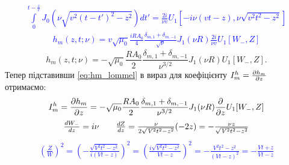 %
\textcolor{blue} { \begin{equation*} \begin{aligned}
\int \limits_{0}^{t - \frac{z}{\mathit{v}}} 
J_0 \left( \nu \sqrt{\mathit{v}^2 (t-t')^2 - z^2} 
\right) dt' = \frac{2i}{\nu \mathit{v}} U_1 
\left[ -i \nu (\mathit{v}t-z), \nu \sqrt{\mathit{v}^2t^2-z^2} \right]
\end{aligned} \end{equation*} }
%
\textcolor{blue} { \begin{equation*} \begin{aligned}
h_m (z, t; \nu) = \mathit{v} \sqrt{\mu_0} \frac{iR A_0}{4} 
\frac{\delta_{m,1} + \delta_{m,-1}} {\sqrt{\nu}} J_1 (\nu R) 
\frac{2i}{\nu \mathit{v}} U_1 \left[ W_-, Z \right]
\end{aligned} \end{equation*} }
%
\begin{equation} \label{eq:hm_lommel}
h_m (z, t; \nu) = - \sqrt{\mu_0} \frac{R A_0}{2} 
\frac{\delta_{m,1} + \delta_{m,-1}}
{\nu^{3/2}} J_1 (\nu R) U_1 \left[ W_-, Z \right].
\end{equation}
%
Тепер підставивши \eqref{eq:hm_lommel} в вираз для коефіцієнту
$ I_{m}^{h} = \frac{\partial h_m}{\partial z} $ отримаємо:
%
\textcolor{blue} { \begin{equation*} \begin{aligned}
I_{m}^{h} = \frac{\partial h_m}{\partial z} = 
- \sqrt{\mu_0} \frac{R A_0}{2} 
\frac{\delta_{m,1} + \delta_{m,-1}}
{\nu^{3/2}} J_1 (\nu R) \frac{\partial }{\partial z} U_1 [ W_-, Z ]
\end{aligned} \end{equation*} }
%
\textcolor{blue} { \begin{equation*} \begin{aligned}
\begin{array}{lcr}
\frac{d W_-}{d z} = i \nu & &
\frac{d Z}{d z} = \frac{\nu}{2 \sqrt{\mathit{V}^2 t^2 - z^2}} (-2z) = 
- \frac{\nu z}{\sqrt{\mathit{V}^2 t^2 - z^2}} \\
\end{array}
\end{aligned} \end{equation*} }
%
\textcolor{blue} { \begin{equation*} \begin{aligned}
\left( \frac{Z}{W} \right)^2 = 
\left( - \frac{ \sqrt{\mathit{V}^2 t^2-z^2}}{i(\mathit{V} t-z)} \right)^2 =
\left( \frac{ i \sqrt{\mathit{V}^2 t^2-z^2}}{\mathit{V}t-z} \right)^2 =
- \frac{\mathit{V}^2 t^2-z^2}{(\mathit{V} t-z)^2} = 
- \frac{\mathit{V}t+z}{\mathit{V}t-z}
\end{aligned} \end{equation*} }
